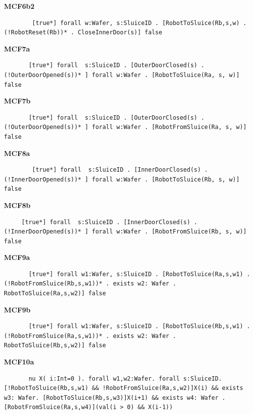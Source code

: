 \documentclass[12pt]{report}
\begin{document}
    \textbf{MCF6b2}
    \begin{lstlisting}
        [true*] forall w:Wafer, s:SluiceID . [RobotToSluice(Rb,s,w) . (!RobotReset(Rb))* . CloseInnerDoor(s)] false
    \end{lstlisting}

    \textbf{MCF7a}
    \begin{lstlisting}
       [true*] forall  s:SluiceID . [OuterDoorClosed(s) . (!OuterDoorOpened(s))* ] forall w:Wafer . [RobotToSluice(Ra, s, w)] false
    \end{lstlisting}

    \textbf{MCF7b}
    \begin{lstlisting}
       [true*] forall  s:SluiceID . [OuterDoorClosed(s) . (!OuterDoorOpened(s))* ] forall w:Wafer . [RobotFromSluice(Ra, s, w)] false
    \end{lstlisting}

    \textbf{MCF8a}
    \begin{lstlisting}
        [true*] forall  s:SluiceID . [InnerDoorClosed(s) . (!InnerDoorOpened(s))* ] forall w:Wafer . [RobotToSluice(Rb, s, w)] false
    \end{lstlisting}

    \textbf{MCF8b}
    \begin{lstlisting}
     [true*] forall  s:SluiceID . [InnerDoorClosed(s) . (!InnerDoorOpened(s))* ] forall w:Wafer . [RobotFromSluice(Rb, s, w)] false
    \end{lstlisting}

    \textbf{MCF9a}
    \begin{lstlisting}
       [true*] forall w1:Wafer, s:SluiceID . [RobotToSluice(Ra,s,w1) . (!RobotFromSluice(Rb,s,w1))* . exists w2: Wafer . RobotToSluice(Ra,s,w2)] false
    \end{lstlisting}

    \textbf{MCF9b}
    \begin{lstlisting}
       [true*] forall w1:Wafer, s:SluiceID . [RobotToSluice(Rb,s,w1) . (!RobotFromSluice(Ra,s,w1))* . exists w2: Wafer . RobotToSluice(Rb,s,w2)] false
    \end{lstlisting}

    \textbf{MCF10a}
    \begin{lstlisting}
       nu X( i:Int=0 ). forall w1,w2:Wafer. forall s:SluiceID. [!RobotToSluice(Rb,s,w1) && !RobotFromSluice(Ra,s,w2)]X(i) && exists w3: Wafer. [RobotToSluice(Rb,s,w3)]X(i+1) && exists w4: Wafer .[RobotFromSluice(Ra,s,w4)](val(i > 0) && X(i-1)) 
    \end{lstlisting}
\end{document}
